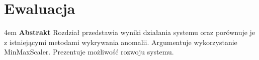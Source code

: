 \chapter{Ewaluacja}

\begingroup
\leftskip4em
\rightskip\leftskip
\noindent
\textbf{Abstrakt} Rozdział przedstawia wyniki działania systemu oraz porównuje je z istniejącymi metodami wykrywania anomalii. Argumentuje wykorzystanie MinMaxScaler. Prezentuje możliwość rozwoju systemu.
\par
\endgroup


